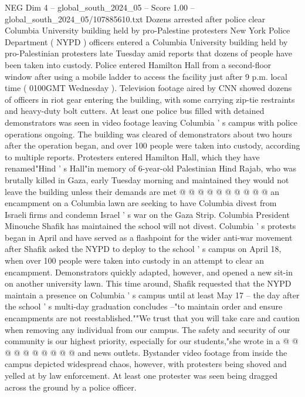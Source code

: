 \begin{textsample}{NEG Dim 4 – global\_south\_2024\_05 – Score 1.00 – global\_south\_2024\_05/107885610.txt}  \label{ex:f4_neg_273}
Dozens arrested after police clear Columbia University building held by pro-Palestine protesters New York Police Department ( NYPD ) officers entered a Columbia University building held by pro-Palestinian protesters late Tuesday amid reports that dozens of people have been taken into custody.
Police entered Hamilton Hall from a second-floor window after using a mobile ladder to access the facility just after 9 p.m. local time ( 0100GMT Wednesday ).
Television footage aired by CNN showed dozens of officers in riot gear entering the building, with some carrying zip-tie restraints and heavy-duty bolt cutters.
At least one police bus filled with detained demonstrators was seen in video footage leaving Columbia ' s campus with police operations ongoing.
The building was cleared of demonstrators about two hours after the operation began, and over 100 people were taken into custody, according to multiple reports.
Protesters entered Hamilton Hall, which they have renamed"Hind ' s Hall"in memory of 6-year-old Palestinian Hind Rajab, who was brutally killed in Gaza, early Tuesday morning and maintained they would not leave the building unless their demands are met @ @ @ @ @ @ @ @ @ @ an encampment on a Columbia lawn are seeking to have Columbia divest from Israeli firms and condemn Israel ' s war on the Gaza Strip.
Columbia President Minouche Shafik has maintained the school will not divest.
Columbia ' s protests began in April and have served as a flashpoint for the wider anti-war movement after Shafik asked the NYPD to deploy to the school ' s campus on April 18, when over 100 people were taken into custody in an attempt to clear an encampment.
Demonstrators quickly adapted, however, and opened a new sit-in on another university lawn.
This time around, Shafik requested that the NYPD maintain a presence on Columbia ' s campus until at least May 17 -- the day after the school ' s multi-day graduation concludes --"to maintain order and ensure encampments are not reestablished.""We trust that you will take care and caution when removing any individual from our campus.
The safety and security of our community is our highest priority, especially for our students,"she wrote in a @ @ @ @ @ @ @ @ @ @ and news outlets.
Bystander video footage from inside the campus depicted widespread chaos, however, with protesters being shoved and yelled at by law enforcement.
At least one protester was seen being dragged across the ground by a police officer.

\end{textsample}
